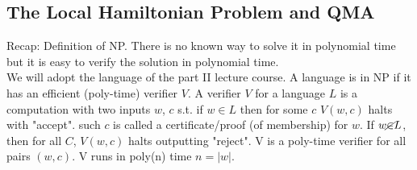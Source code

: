 \documentclass{article}
\begin{document}
\subsection{The Local Hamiltonian Problem and QMA}
Recap: Definition of NP. There is no known way to solve it in polynomial time but it is easy to verify the solution in polynomial time.\\
We will adopt the language of the part II lecture course. A language is in NP if it has an efficient (poly-time) verifier $V$. A verifier $V$ for a language $L$ is a computation with two inputs $w$, $c$ s.t. if $w \in L$ then for some $c$ $V(w,c)$ halts with "accept". such $c$ is called a certificate/proof (of membership) for $w$. If $w \cancel{\in} L$, then for all $C$, $V(w,c)$ halts outputting "reject". V is a poly-time verifier for all pairs $(w,c)$. V runs in poly(n) time $n = |w|$.
\end{document}
